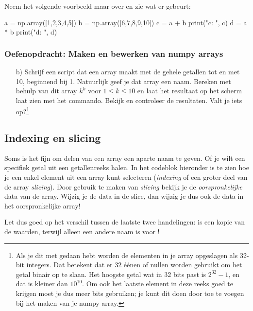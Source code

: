 \documentclass[a4paper,11pt, fleqn]{article}
\begin{document}
Neem het volgende voorbeeld maar over en zie wat er gebeurt:
\begin{python}
a = np.array([1,2,3,4,5])
b = np.array([6,7,8,9,10])
c = a + b
print("c: ", c)
d = a * b
print("d: ", d)
\end{python}

\subsubsection*{Oefenopdracht: Maken en bewerken van numpy arrays}
\begin{itemize}
	\item[b)] Schrijf een script dat een array maakt met de gehele getallen tot en met 10, beginnend bij 1. Natuurlijk geef je dat array een naam. Bereken met behulp van dit array $k^k$ voor $1\leq k \leq 10$ en laat het resultaat op het scherm laat zien met het  commando. Bekijk en controleer de resultaten. Valt je iets op?\footnote{Als je dit met  gedaan hebt worden de elementen in je array opgeslagen als 32-bit integers. Dat betekent dat er 32 \'e\'enen of nullen worden gebruikt om het getal binair op te slaan. Het hoogste getal wat in 32 bits past is $2^{32}-1$, en dat is kleiner dan $10^{10}$. Om ook het laatste element in deze reeks goed te krijgen moet je dus meer bits gebruiken; je kunt dit doen door  toe te voegen bij het maken van je numpy array.}
\end{itemize}

\subsection{Indexing en slicing}
Soms is het fijn om delen van een array een aparte naam te geven. Of je wilt een specifiek getal uit een getallenreeks halen. In het codeblok hieronder is te zien hoe je een enkel element uit een array kunt selecteren {(\it indexing} of een groter deel van de array {\it slicing}). Door gebruik te maken van {\it slicing} bekijk je de {\it oorspronkelijke} data van de array. Wijzig je de data in de slice, dan wijzig je dus ook de data in het oorspronkelijke array!


Let dus goed op het verschil tussen de laatste twee handelingen:  is een kopie van de waarden, terwijl  alleen een andere naam is voor !
\end{document}

